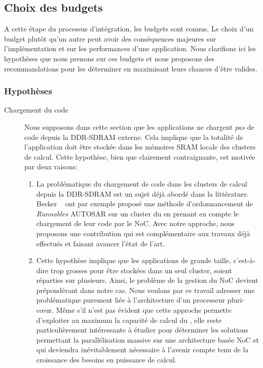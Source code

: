 \documentclass[main.tex]{subfiles}
\begin{document}
\subsection{Choix des budgets}
A cette étape du processus d'intégration, les budgets sont connus. Le choix d'un budget plutôt qu'un autre peut avoir des conséquences majeures sur l'implémentation et sur les performances d'une application. Nous clarifions ici les hypothèses que nous prenons sur ces budgets et nous proposons des recommandations pour les déterminer en maximisant leurs chances d'être valides.
\subsubsection{Hypothèses}
\begin{description}
    \item[Chargement du code]
        Nous supposons dans cette section que les applications ne chargent \emph{pas} de code depuis la DDR-SDRAM externe. Cela implique que la totalité de l'application doit être stockée dans les mémoires SRAM locale des clusters de calcul. Cette hypothèse, bien que clairement contraignante, est motivée par deux raisons:
        \begin{enumerate}
            \item La problématique du chargement de code dans les clusters de calcul depuis la DDR-SDRAM est un sujet déjà abordé dans la littérature. Becker \etal~\cite{Becker16} ont par exemple proposé une méthode d'ordonnancement de \emph{Runnables} AUTOSAR sur un cluster du \mppalong en prenant en compte le chargement de leur code par le NoC. Avec notre approche, nous proposons une contribution qui est complémentaire aux travaux déjà effectués et faisant avancer l'état de l'art.
            \item Cette hypothèse implique que les applications de grande taille, c'est-à-dire trop grosses pour être stockées dans un seul cluster, soient réparties sur plusieurs. Ainsi, le problème de la gestion du NoC devient prépondérant dans notre cas. Nous voulons par ce travail adresser une problématique purement liée à l'architecture d'un processeur pluri-c\oe{}ur. Même s'il n'est pas évident que cette approche permette d'exploiter au maximum la capacité de calcul du \mppalong, elle reste particulièrement intéressante à étudier pour déterminer les solutions permettant la parallélisation massive sur une architecture basée NoC et qui deviendra inévitablement nécessaire à l'avenir compte tenu de la croissance des besoins en puissance de calcul.

\end{enumerate}
\end{description}
\end{document}
